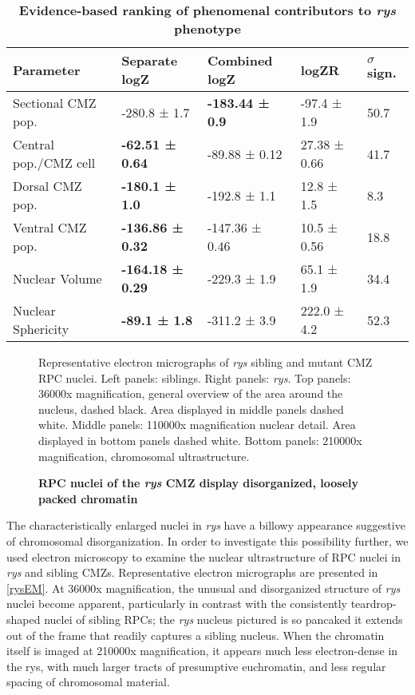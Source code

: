 \begin{table}[!ht]
    \centering
    \caption{{\bf Evidence-based ranking of phenomenal contributors to \textit{rys} phenotype}}
    \begin{tabular}{|l|l|l|l|l|} 
        \hline {\bf Parameter} & {\bf Separate logZ} & {\bf Combined logZ} & {\bf logZR} & {\bf $\sigma$ sign.}\\ \hline 
        Sectional CMZ pop. & -280.8 ± 1.7 & {\bf -183.44 ± 0.9} & -97.4 ± 1.9 & 50.7 \\ \hline
        Central pop./CMZ cell & {\bf -62.51 ± 0.64} & -89.88 ± 0.12 & 27.38 ± 0.66 & 41.7 \\ \hline
        Dorsal CMZ pop.  & {\bf -180.1 ± 1.0} & -192.8 ± 1.1 & 12.8 ± 1.5 & 8.3 \\ \hline
        Ventral CMZ pop. & {\bf -136.86 ± 0.32} & -147.36 ± 0.46 & 10.5 ± 0.56 & 18.8 \\ \hline
        Nuclear Volume & {\bf -164.18 ± 0.29} & -229.3 ± 1.9 & 65.1 ± 1.9 & 34.4 \\ \hline
        Nuclear Sphericity & {\bf -89.1 ± 1.8} & -311.2 ± 3.9 & 222.0 ± 4.2 & 52.3 \\ \hline
    \end{tabular}
    \label{nuclearev}
\end{table}


\FloatBarrier

\begin{figure}[!h]
    \caption{{\bf RPC nuclei of the \textit{rys} CMZ display disorganized, loosely packed chromatin}}
    Representative electron micrographs of \textit{rys} sibling and mutant CMZ RPC nuclei.
    Left panels: siblings. Right panels: \textit{rys}. Top panels: 36000x magnification, general overview of the area around the nucleus, dashed black. Area displayed in middle panels dashed white. Middle panels: 110000x magnification nuclear detail. Area displayed in bottom panels dashed white. Bottom panels: 210000x magnification, chromosomal ultrastructure.
    \label{rysEM}
\end{figure}

The characteristically enlarged nuclei in \textit{rys} have a billowy appearance suggestive of chromosomal disorganization. In order to investigate this possibility further, we used electron microscopy to examine the nuclear ultrastructure of RPC nuclei in \textit{rys} and sibling CMZs. Representative electron micrographs are presented in \autoref{rysEM}. At 36000x magnification, the unusual and disorganized structure of \textit{rys} nuclei become apparent, particularly in contrast with the consistently teardrop-shaped nuclei of sibling RPCs; the \textit{rys} nucleus pictured is so pancaked it extends out of the frame that readily captures a sibling nucleus. When the chromatin itself is imaged at 210000x magnification, it appears much less electron-dense in the rys, with much larger tracts of presumptive euchromatin, and less regular spacing of chromosomal material.
\FloatBarrier

